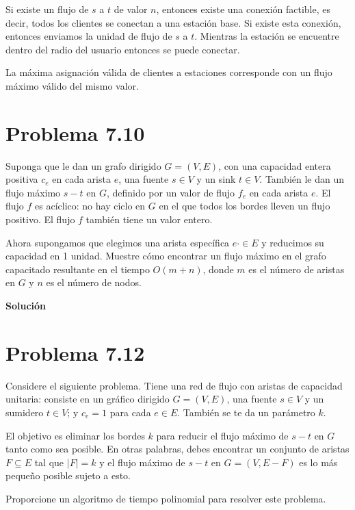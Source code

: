 \documentclass{article}
\begin{document}
Si existe un flujo de $s$ a $t$ de valor $n$, entonces existe una conexión
factible, es decir, todos los clientes se conectan a una estación base. Si
existe esta conexión, entonces enviamos la unidad de flujo de $s$ a $t$.
Mientras la estación se encuentre dentro del radio del usuario entonces se puede
conectar.

La máxima asignación válida de clientes a estaciones corresponde con un flujo
máximo válido del mismo valor.

\section*{Problema 7.10}

Suponga que le dan un grafo dirigido $G = (V , E)$, con una capacidad entera
positiva $c_e$ en cada arista $e$, una fuente $s \in V$ y un sink $t \in V$.
También le dan un flujo máximo $s-t$ en $G$, definido por un valor de flujo
$f_e$ en cada arista $e$. El flujo $f$ es acíclico: no hay ciclo en $G$ en el
que todos los bordes lleven un flujo positivo. El flujo $f$ también tiene un
valor entero.

Ahora supongamos que elegimos una arista específica $e \cdot \in E$ y reducimos
su capacidad en 1 unidad. Muestre cómo encontrar un flujo máximo en el grafo
capacitado resultante en el tiempo $O(m + n)$, donde $m$ es el número de aristas
en $G$ y $n$ es el número de nodos.

\textbf{Solución}




\section*{Problema 7.12}

Considere el siguiente problema. Tiene una red de flujo con aristas de capacidad
unitaria: consiste en un gráfico dirigido $G = (V , E)$, una fuente $s \in V$ y
un sumidero $t \in V$; y $c_e = 1$ para cada $e \in E$. También se te da un
parámetro $k$.

El objetivo es eliminar los bordes $k$ para reducir el flujo máximo de $s-t$ en
$G$ tanto como sea posible. En otras palabras, debes encontrar un conjunto de
aristas $F \subseteq E$ tal que $|F| = k$ y el flujo máximo de $s-t$ en $G = (V
, E - F)$ es lo más pequeño posible sujeto a esto.

Proporcione un algoritmo de tiempo polinomial para resolver este problema.

\end{document}
